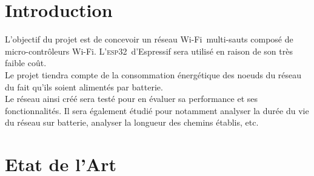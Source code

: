 \documentclass[a4paper, 12pt]{report}
\newcommand{\esp}{\textsc{esp32}}
\newcommand{\wifi}{Wi-Fi}
\begin{document}
\chapter*{Introduction}
    L'objectif du projet est de concevoir un réseau \wifi\ multi-sauts composé 
    de micro-contrôleurs \wifi. L'\esp\ d'Espressif sera utilisé en raison de 
    son très faible coût.\\
    Le projet tiendra compte de la consommation énergétique des noeuds du 
    réseau du fait qu'ils soient alimentés par batterie.\\
    Le réseau ainsi créé sera testé pour en évaluer sa performance et ses fonctionnalités. 
    Il sera également étudié pour notamment analyser la durée du vie du réseau 
    sur batterie, analyser la longueur des chemins établis, etc.

\tableofcontents
\newpage

\chapter{Etat de l'Art}
\end{document}
